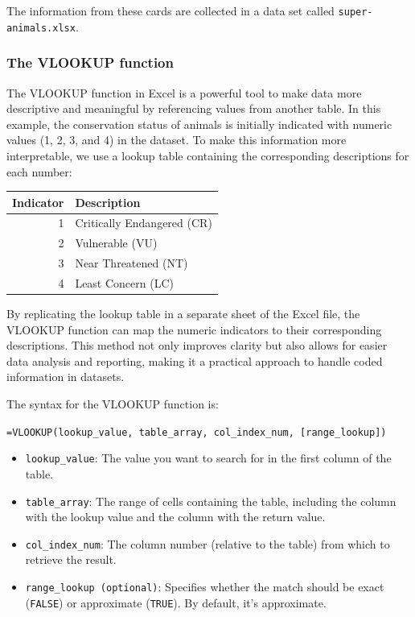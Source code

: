 \documentclass[
]{book}
\begin{document}
The information from these cards are collected in a data set called \texttt{super-animals.xlsx}.

\subsubsection*{The VLOOKUP function}\label{the-vlookup-function}

The VLOOKUP function in Excel is a powerful tool to make data more descriptive and meaningful by referencing values from another table. In this example, the conservation status of animals is initially indicated with numeric values (1, 2, 3, and 4) in the dataset. To make this information more interpretable, we use a lookup table containing the corresponding descriptions for each number:

\begin{table}
\centering
\begin{tabular}[t]{r|l}
\hline
Indicator & Description\\
\hline
1 & Critically Endangered (CR)\\
\hline
2 & Vulnerable (VU)\\
\hline
3 & Near Threatened (NT)\\
\hline
4 & Least Concern (LC)\\
\hline
\end{tabular}
\end{table}

By replicating the lookup table in a separate sheet of the Excel file, the VLOOKUP function can map the numeric indicators to their corresponding descriptions. This method not only improves clarity but also allows for easier data analysis and reporting, making it a practical approach to handle coded information in datasets.

The syntax for the VLOOKUP function is:

\texttt{=VLOOKUP(lookup\_value,\ table\_array,\ col\_index\_num,\ {[}range\_lookup{]})}

\begin{itemize}
\item
  \texttt{lookup\_value}: The value you want to search for in the first column of the table.
\item
  \texttt{table\_array}: The range of cells containing the table, including the column with the lookup value and the column with the return value.
\item
  \texttt{col\_index\_num}: The column number (relative to the table) from which to retrieve the result.
\item
  \texttt{range\_lookup\ (optional)}: Specifies whether the match should be exact (\texttt{FALSE}) or approximate (\texttt{TRUE}). By default, it's approximate.
\end{itemize}
\end{document}

